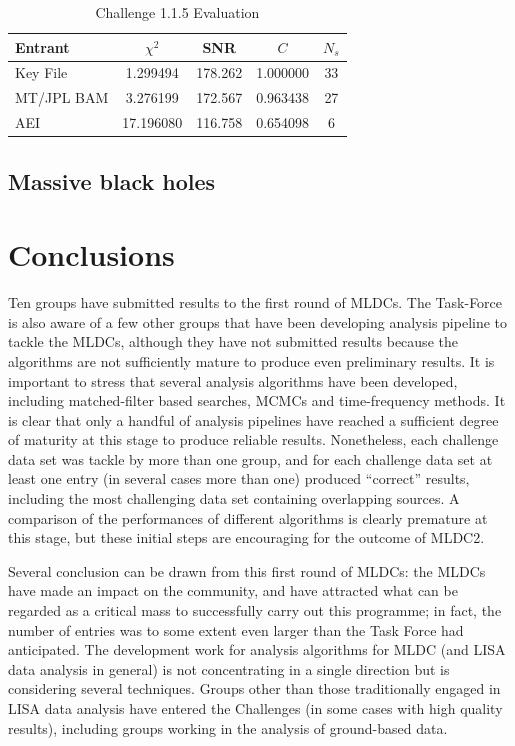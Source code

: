 \documentclass[11pt]{article}
\begin{document}
\begin{table}[t]
\caption{\label{Challenge1.1.5}Challenge 1.1.5 Evaluation}
\begin{center}
\begin{tabular}{|l|c|c|c|c|}
\hline
Entrant  & $\chi^2$ & SNR & $C$ & $N_s$ \\
 \hline
Key File   &  1.299494 & 178.262 & 1.000000 & 33 \\
MT/JPL BAM &  3.276199 & 172.567 & 0.963438 & 27 \\
AEI        &  17.196080 & 116.758 & 0.654098 & 6 \\
\hline  
\end{tabular}
\end{center}
\end{table}


\subsection{Massive black holes}


\section{Conclusions}

Ten groups have submitted results to the first round of MLDCs. The Task-Force is also aware of a few other groups that have been developing analysis pipeline to tackle the MLDCs, although they have not submitted results because the algorithms are not sufficiently mature to produce even preliminary results. It is important to stress that several analysis algorithms have been developed, including matched-filter based searches, MCMCs and time-frequency methods. It is clear that only a handful of analysis pipelines have reached a sufficient degree of maturity at this stage to produce reliable results. Nonetheless, each challenge data set was tackle by more than one group, and for each challenge data set at least one entry (in several cases more than one) produced ``correct'' results, including the most challenging data set containing overlapping sources. A comparison of the performances of different algorithms is clearly premature at this stage, but these initial steps are encouraging for the outcome of MLDC2.

Several conclusion can be drawn from this first round of MLDCs: the MLDCs have made an impact on the community, and  have attracted what can be regarded as a critical mass to successfully carry out this programme; in fact, the number of entries was to some extent even larger than the Task Force had anticipated. The development work for analysis algorithms for MLDC (and LISA data analysis in general) is not concentrating in a single direction but is considering several techniques. Groups other than those traditionally engaged in LISA data analysis have entered the Challenges (in some cases with high quality results), including groups working in the analysis of ground-based data. 
\end{document}
